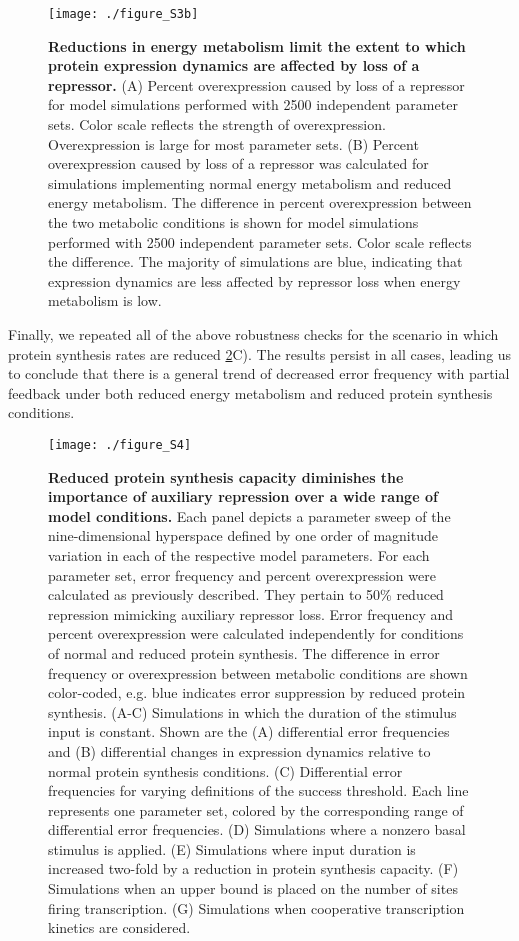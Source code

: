 \begin{figure}[h!]
\centering
\texttt{[image: ./figure\_S3b]}
\caption[Reduced metabolism desensitizes protein dynamics to repression.]{\textbf{Reductions in energy metabolism limit the extent to which protein expression dynamics are affected by loss of a repressor.} (A) Percent overexpression caused by loss of a repressor for model simulations performed with 2500 independent parameter sets. Color scale reflects the strength of overexpression. Overexpression is large for most parameter sets. (B) Percent overexpression caused by loss of a repressor was calculated for simulations implementing normal energy metabolism and reduced energy metabolism. The difference in percent overexpression between the two metabolic conditions is shown for model simulations performed with 2500 independent parameter sets. Color scale reflects the difference. The majority of simulations are blue, indicating that expression dynamics are less affected by repressor loss when energy metabolism is low.}
\label{fig:metabolism:figS3b}
\end{figure}

Finally, we repeated all of the above robustness checks for the scenario in which protein synthesis rates are reduced \ref{fig:metabolism:figS4}C). The results persist in all cases, leading us to conclude that there is a general trend of decreased error frequency with partial feedback under both reduced energy metabolism and reduced protein synthesis conditions.

\begin{figure}[h!]
\centering
\texttt{[image: ./figure\_S4]}
\caption[Robustness of ribosomopathy simulations to model assumptions.]{\textbf{Reduced protein synthesis capacity diminishes the importance of auxiliary repression over a wide range of model conditions.} Each panel depicts a parameter sweep of the nine-dimensional hyperspace defined by one order of magnitude variation in each of the respective model parameters. For each parameter set, error frequency and percent overexpression were calculated as previously described. They pertain to 50\% reduced repression mimicking auxiliary repressor loss. Error frequency and percent overexpression were calculated independently for conditions of normal and reduced protein synthesis. The difference in error frequency or overexpression between metabolic conditions are shown color-coded, e.g. blue indicates error suppression by reduced protein synthesis. (A-C) Simulations in which the duration of the stimulus input is constant. Shown are the (A) differential error frequencies and (B) differential changes in expression dynamics relative to normal protein synthesis conditions. (C) Differential error frequencies for varying definitions of the success threshold. Each line represents one parameter set, colored by the corresponding range of differential error frequencies. (D) Simulations where a nonzero basal stimulus is applied. (E) Simulations where input duration is increased two-fold by a reduction in protein synthesis capacity. (F) Simulations when an upper bound is placed on the number of sites firing transcription. (G) Simulations when cooperative transcription kinetics are considered.}
\label{fig:metabolism:figS4}
\end{figure}
